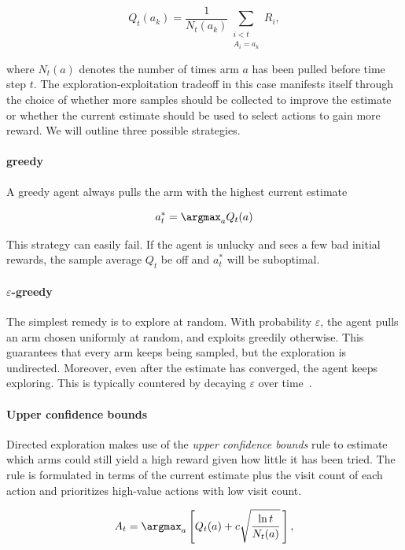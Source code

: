\begin{equation}\label{eq:bandit-sample-average}
  Q_t(a_k)=\frac{1}{N_t(a_k)}\sum_{\substack{i<t\\A_i=a_k}}R_i,
\end{equation}

where $N_t(a)$ denotes the number of times arm $a$ has been pulled before time step $t$.
The exploration-exploitation tradeoff in this case manifests itself through the choice
of whether more samples should be collected to improve the estimate or whether
the current estimate should be used to select actions to gain more reward.
We will outline three possible strategies.

\paragraph{greedy}

A greedy agent always pulls the arm with the highest current estimate

\[
  a_t^*=\argmax_{a} Q_t(a)
\]

This strategy can easily fail.
If the agent is unlucky and sees a few bad initial rewards, the sample average $Q_t$ be off and $a_t^*$ will be suboptimal.

\paragraph{$\varepsilon$-greedy}
The simplest remedy is to explore at random.
With probability $\varepsilon$, the agent pulls an arm chosen uniformly at random, and exploits greedily otherwise.
This guarantees that every arm keeps being sampled, but the exploration is undirected.
Moreover, even after the estimate has converged, the agent keeps exploring.
This is typically countered by decaying $\varepsilon$ over time~\cite{sutton_reinforcement_2020}.

\paragraph{Upper confidence bounds}
Directed exploration makes use of the \emph{upper confidence bounds} rule to estimate which arms
could still yield a high reward given how little it has been tried.
The rule is formulated in terms of the current estimate plus the visit count of each action
and prioritizes high-value actions with low visit count.

\begin{equation}\label{eq:ucb}
  A_t=\argmax_a\left[Q_t(a)+c\sqrt{\frac{\ln t}{N_t(a)}}\,\right],
\end{equation}

